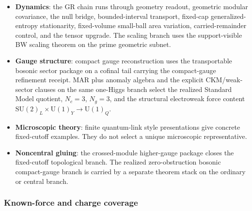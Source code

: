 \begin{itemize}
\tightlist
\item \textbf{Dynamics}: the GR chain runs through geometry readout, geometric modular covariance, the null bridge,
bounded-interval transport, fixed-cap generalized-entropy stationarity, fixed-volume small-ball
area variation, carried-remainder control, and the tensor upgrade. The scaling branch uses
the support-visible BW scaling theorem on the prime geometric subnet.
\item \textbf{Gauge structure}: compact gauge reconstruction uses the transportable bosonic
sector package on a cofinal tail carrying the compact-gauge refinement receipt. MAR plus anomaly algebra and the explicit CKM/weak-sector clauses on the same
one-Higgs branch select the realized Standard Model quotient, \(N_c=3\), \(N_g=3\), and the
structural electroweak force content \(\mathrm{SU}(2)_L\times\mathrm U(1)_Y\to\mathrm U(1)_Q\).
\item \textbf{Microscopic theory}: finite quantum-link style presentations give concrete
fixed-cutoff examples. They do not select a unique microscopic representative.
\item \textbf{Noncentral gluing}: the crossed-module higher-gauge package closes the fixed-cutoff
topological branch. The realized zero-obstruction bosonic compact-gauge branch is carried by a
separate theorem stack on the ordinary or central branch.
\end{itemize}

\subsubsection{Known-force and charge coverage}\label{82a-known-force-and-charge-coverage}

